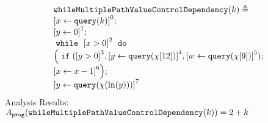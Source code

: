                 \begin{example}
                    \label{ex:whileMultiplePathValueControlDependency}
                    \[
                        \begin{array}{l}
                        \kw{whileMultiplePathValueControlDependency}(k) \triangleq\\
                            \clabel{ \assign{x}{\query(k)}}^{0} ; \\
                            \clabel{\assign{y}{0} }^{1} ; \\
                                \ewhile ~ \clabel{x > 0}^{2} ~ \edo ~ \\
                                \Big(
                                 \eif(\clabel{y > 0}^{3}, 
                                 \clabel{\assign{y}{\query(\chi[12])}}^{4}, 
                                 \clabel{\assign{w}{\query(\chi[9])}}^{5});                            
                                 \\
                                 \clabel{\assign{x}{x-1}}^{6}\Big);\\
                                 \clabel{\assign{y}{\query(\chi(\ln(y)))} }^{7} 
                            \end{array}
                        \]
                        Analysis Results: $ A_{\mathtt{prog}}(\mathtt{whileMultiplePathValueControlDependency}(k)) = 2 + k $
                    \end{example}
